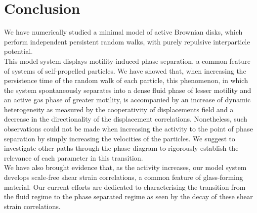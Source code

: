 \documentclass[class=report, float=false, crop=false]{standalone}
\begin{document}
\chapter*{Conclusion}
\label{conclusion}

We have numerically studied a minimal model of active Brownian disks, which perform independent persistent random walks, with purely repulsive interparticle potential.\\

This model system displays motility-induced phase separation, a common feature of systems of self-propelled particles. We have showed that, when increasing the persistence time of the random walk of each particle, this phenomenon, in which the system spontaneously separates into a dense fluid phase of lesser motility and an active gas phase of greater motility, is accompanied by an increase of dynamic heterogeneity as measured by the cooperativity of displacements field and a decrease in the directionality of the displacement correlations. Nonetheless, such observations could not be made when increasing the activity to the point of phase separation by simply increasing the velocities of the particles. We suggest to investigate other paths through the phase diagram to rigorously establish the relevance of each parameter in this transition.\\

We have also brought evidence that, as the activity increases, our model system develops scale-free shear strain correlations, a common feature of glass-forming material. Our current efforts are dedicated to characterising the transition from the fluid regime to the phase separated regime as seen by the decay of these shear strain correlations.
\end{document}
